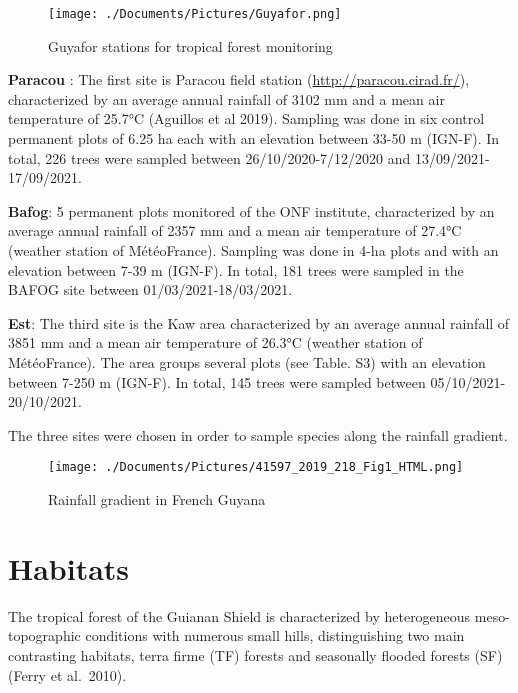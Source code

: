 \documentclass[
]{book}
\begin{document}
\begin{figure}
\centering
\texttt{[image: ./Documents/Pictures/Guyafor.png]}
\caption{Guyafor stations for tropical forest monitoring}
\end{figure}

\textbf{Paracou }: The first site is Paracou field station (\url{http://paracou.cirad.fr/}), characterized by an average annual rainfall of 3102 mm and a mean air temperature of 25.7°C (Aguillos et al 2019). Sampling was done in six control permanent plots of 6.25 ha each with an elevation between 33-50 m (IGN-F). In total, 226 trees were sampled between 26/10/2020-7/12/2020 and 13/09/2021-17/09/2021.

\textbf{Bafog}: 5 permanent plots monitored of the ONF institute, characterized by an average annual rainfall of 2357 mm and a mean air temperature of 27.4°C (weather station of MétéoFrance). Sampling was done in 4-ha plots and with an elevation between 7-39 m (IGN-F). In total, 181 trees were sampled in the BAFOG site between 01/03/2021-18/03/2021.

\textbf{Est}: The third site is the Kaw area characterized by an average annual rainfall of 3851 mm and a mean air temperature of 26.3°C (weather station of MétéoFrance). The area groups several plots (see Table. S3) with an elevation between 7-250 m (IGN-F). In total, 145 trees were sampled between 05/10/2021-20/10/2021.

The three sites were chosen in order to sample species along the rainfall gradient.

\begin{figure}
\centering
\texttt{[image: ./Documents/Pictures/41597\_2019\_218\_Fig1\_HTML.png]}
\caption{Rainfall gradient in French Guyana}
\end{figure}

\hypertarget{habitats}{%
\section{Habitats}\label{habitats}}

The tropical forest of the Guianan Shield is characterized by heterogeneous meso-topographic conditions with numerous small hills, distinguishing two main contrasting habitats, terra firme (TF) forests and seasonally flooded forests (SF) (Ferry et al.~2010).
\end{document}

